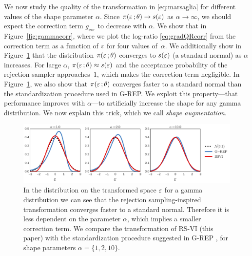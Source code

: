 We now study the quality of the transformation in \eqref{eq:marsaglia} for different values of the shape parameter $\alpha$. Since $\pi(\varepsilon\, ;\theta) \to s(\varepsilon)$ as $\alpha\to\infty$, we should expect the correction term $g_{\text{cor}}$ to decrease with $\alpha$. We show that in Figure~\ref{fig:gammacorr}, where we plot the log-ratio \eqref{eq:gradQRcorr} from the correction term as a function of $\varepsilon$ for four values of~$\alpha$. We additionally show in Figure~\ref{fig:compare_qeps} that the distribution $\pi(\varepsilon\, ;\theta)$ converges to $s(\varepsilon)$ (a standard normal) as $\alpha$ increases. For large $\alpha$, $\pi(\varepsilon\, ;\theta)\approx s(\varepsilon)$ and the acceptance probability of the rejection sampler approaches~$1$, which makes the correction term negligible. In Figure~\ref{fig:compare_qeps}, we also show that $\pi(\varepsilon\, ;\theta)$ converges faster to a standard normal than the standardization procedure used in \gls{G-REP}. We exploit this property---that performance improves with $\alpha$---to artificially increase the shape for any gamma distribution. We now explain this trick, which we call \emph{shape augmentation}.
\begin{figure}[t]
  \centering
  \includegraphics[width=1.5\columnwidth]{compare_Qeps} 
  \vspace*{-10pt}
  \caption{In the distribution on the transformed space $\varepsilon$ for a gamma distribution we can see that the rejection sampling-inspired transformation converges faster to a standard normal. Therefore it is less dependent on the parameter $\alpha$, which implies a smaller correction term. We compare the transformation of \gls{RS-VI} (this paper) with the standardization procedure suggested in \gls{G-REP} \citep{RuizTB2016}, for shape parameters $\alpha = \{1,2,10\}$.}
  \label{fig:compare_qeps}
\end{figure}

